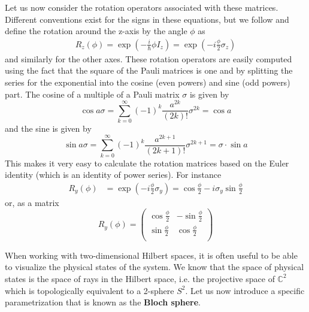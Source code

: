 \documentclass[a4paper, draft]{article}
\theoremstyle{own}
\theoremstyle{remark}
\newcommand{\C}{\mathbb{C}}
\begin{document}
Let us now consider the rotation operators associated with these matrices. Different conventions exist for the signs in these equations, but we follow \cite{Levitt} and define the rotation around the z-axis by the angle $\phi$ as 
\begin{align}
\label{eq:rotationzaxis}
R_z(\phi) = \exp\left({-\frac{i}{\hbar}\phi I_z}\right) = \exp\left( {-i\frac{\phi}{2}  \sigma_z}\right)
\end{align}
and similarly for the other axes. These rotation operators are easily computed using the fact that the square of the Pauli matrices is one and by splitting the series for the exponential into the cosine (even powers) and sine (odd powers) part. The cosine of a multiple of a Pauli matrix $\sigma$ is given by
$$
\cos a \sigma = \sum_{k=0}^\infty (-1)^k \frac{a^{2k}}{(2k)!} \sigma^{2k} =  \cos a
$$
and the sine is given by
$$
\sin a \sigma = \sum_{k=0}^\infty (-1)^k \frac{a^{2k+1}}{(2k+1)!} \sigma^{2k+1} = \sigma \cdot \sin a
$$
This makes it very easy to calculate the rotation matrices based on the Euler identity (which is an identity of power series). For instance
\begin{align*}
R_y(\phi) &=  \exp\left( {-i \frac{\phi}{2}   \sigma_y} \right) = 
 \cos \frac{\phi}{2} - i \sigma_y \sin \frac{\phi}{2}
\end{align*}
or, as a matrix
$$
R_y(\phi) = 
\begin{pmatrix}
\cos \frac{\phi}{2} & - \sin \frac{\phi}{2} \\
\sin \frac{\phi}{2} & \cos \frac{\phi}{2} \\
\end{pmatrix}
$$

When working with two-dimensional Hilbert spaces, it is often useful to be able to visualize the physical states of the system. We know that the space of physical states is the space of rays in the Hilbert space, i.e. the projective space of $\C^2$ which is topologically equivalent to a 2-sphere $S^2$. Let us now introduce a specific parametrization that is known as the {\bf Bloch sphere}.
\end{document}
